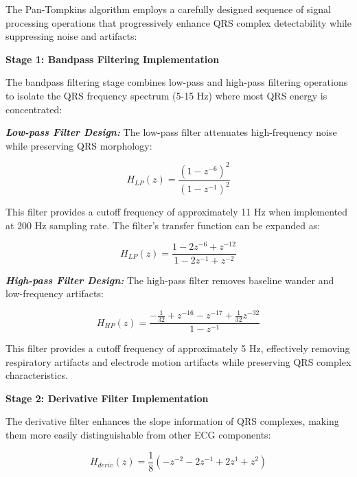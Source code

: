 \documentclass[12pt,a4paper]{article}
\begin{document}
The Pan-Tompkins algorithm employs a carefully designed sequence of signal processing operations that progressively enhance QRS complex detectability while suppressing noise and artifacts:

\vspace{0.5cm}

\textbf{Stage 1: Bandpass Filtering Implementation}

The bandpass filtering stage combines low-pass and high-pass filtering operations to isolate the QRS frequency spectrum (5-15 Hz) where most QRS energy is concentrated:

\vspace{0.3cm}

\textbf{\textit{Low-pass Filter Design:}}
The low-pass filter attenuates high-frequency noise while preserving QRS morphology:

\begin{equation*}
H_{LP}(z) = \frac{(1-z^{-6})^2}{(1-z^{-1})^2}
\end{equation*}

This filter provides a cutoff frequency of approximately 11 Hz when implemented at 200 Hz sampling rate. The filter's transfer function can be expanded as:

\begin{equation*}
H_{LP}(z) = \frac{1 - 2z^{-6} + z^{-12}}{1 - 2z^{-1} + z^{-2}}
\end{equation*}

\textbf{\textit{High-pass Filter Design:}}
The high-pass filter removes baseline wander and low-frequency artifacts:

\begin{equation*}
H_{HP}(z) = \frac{-\frac{1}{32} + z^{-16} - z^{-17} + \frac{1}{32}z^{-32}}{1 - z^{-1}}
\end{equation*}

This filter provides a cutoff frequency of approximately 5 Hz, effectively removing respiratory artifacts and electrode motion artifacts while preserving QRS complex characteristics.

\vspace{0.5cm}

\textbf{Stage 2: Derivative Filter Implementation}

The derivative filter enhances the slope information of QRS complexes, making them more easily distinguishable from other ECG components:

\begin{equation*}
H_{deriv}(z) = \frac{1}{8}(-z^{-2} - 2z^{-1} + 2z^{1} + z^{2})
\end{equation*}
\end{document}
